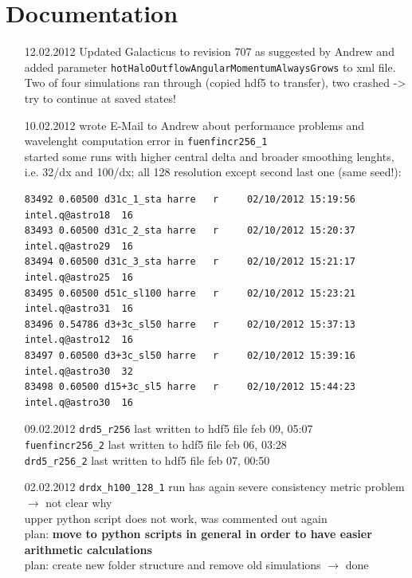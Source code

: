 \documentclass[a4paper,11pt,fleqn,oneside]{book}
\begin{document}
\tableofcontents


\chapter{Documentation}

\begin{itemize}

\item[12.02.2012]
Updated Galacticus to revision 707 as suggested by Andrew and added parameter 
\texttt{hotHaloOutflowAngularMomentumAlwaysGrows} to xml file. \\
Two of four simulations ran through (copied hdf5 to transfer), 
two crashed -> try to continue at saved states!


\item[10.02.2012]
wrote E-Mail to Andrew about performance problems and wavelenght computation error 
in \texttt{fuenfincr256\_1} \\
started some runs with higher central delta and broader smoothing lenghts, i.e. 
32/dx and 100/dx; all 128 resolution except second last one (same seed!): 
\begin{verbatim}
83492 0.60500 d31c_1_sta harre   r     02/10/2012 15:19:56 intel.q@astro18  16        
83493 0.60500 d31c_2_sta harre   r     02/10/2012 15:20:37 intel.q@astro29  16        
83494 0.60500 d31c_3_sta harre   r     02/10/2012 15:21:17 intel.q@astro25  16        
83495 0.60500 d51c_sl100 harre   r     02/10/2012 15:23:21 intel.q@astro31  16  
83496 0.54786 d3+3c_sl50 harre   r     02/10/2012 15:37:13 intel.q@astro12  16        
83497 0.60500 d3+3c_sl50 harre   r     02/10/2012 15:39:16 intel.q@astro30  32  
83498 0.60500 d15+3c_sl5 harre   r     02/10/2012 15:44:23 intel.q@astro30  16        
\end{verbatim}

\item[09.02.2012]
\texttt{drd5\_r256} last written to hdf5 file feb 09, 05:07 \\
\texttt{fuenfincr256\_2} last written to hdf5 file feb 06, 03:28 \\
\texttt{drd5\_r256\_2} last written to hdf5 file feb 07, 00:50 \\

\item[02.02.2012]
\texttt{drdx\_h100\_128\_1} run has again severe consistency 
metric problem \\ $\rightarrow$ not clear why \\
upper python script does not work, was commented out again \\
plan: \textbf{move to python scripts in general in order to have
 easier arithmetic calculations} \\   
plan: create new folder structure and remove old simulations $\rightarrow$ done \\


\end{itemize}
\end{document}
